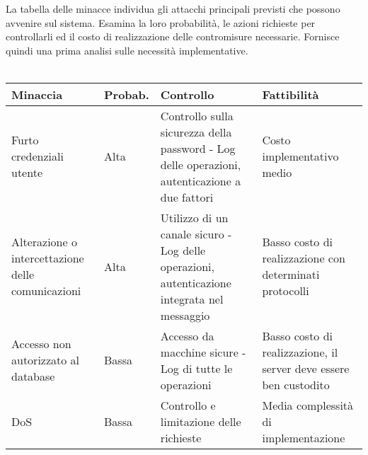 \clearpage

La tabella delle minacce individua gli attacchi principali previsti che possono avvenire sul sistema.
Esamina la loro probabilità, le azioni richieste per controllarli ed il costo di realizzazione delle contromisure necessarie.
Fornisce quindi una prima analisi sulle necessità implementative.\\
\\

\begin{table}[htbp]
    \centering
    \begin{tabular} {|P{3cm}|P{2cm}|P{6.1cm}|P{4cm}|}
        \hline
        \textbf{Minaccia}                                 & \textbf{Probab.} & \textbf{Controllo}                                                                                                                                                                                                                      & \textbf{Fattibilità}                                              \\
        \hline
        Furto credenziali utente                          & Alta             & Controllo sulla sicurezza della password - Log delle operazioni, autenticazione a due fattori                                                                                                                                           & Costo implementativo medio                                        \\
        \hline
        Alterazione o intercettazione delle comunicazioni & Alta             & Utilizzo di un canale sicuro - Log delle operazioni, autenticazione integrata nel messaggio                                                                                                                                             & Basso costo di realizzazione con determinati protocolli           \\
        \hline
        Accesso non autorizzato al database               & Bassa            & Accesso da macchine sicure - Log di tutte le operazioni                                                                                                                                                                                 & Basso costo di realizzazione, il server deve essere ben custodito \\
        \hline
        DoS                                               & Bassa            & Controllo e limitazione delle richieste                                                                                                                                                                                                 & Media complessità di implementazione                              \\

\end{tabular}
\end{table}
